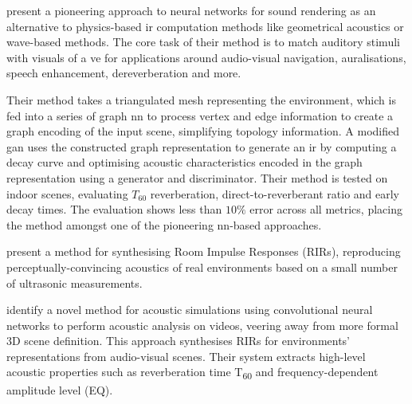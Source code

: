 \cite{ratnarajah2022mesh2ir} present a pioneering approach to neural networks for sound rendering as an alternative to physics-based \acrshort{ir} computation methods like geometrical acoustics or wave-based methods. The core task of their method is to match auditory stimuli with visuals of a \acrshort{ve} for applications around audio-visual navigation, auralisations, speech enhancement, dereverberation and more.\par
Their method takes a triangulated mesh representing the environment, which is fed into a series of graph \acrshort{nn} to process vertex and edge information to create a graph encoding of the input scene, simplifying topology information. A modified \acrfull{gan} uses the constructed graph representation to generate an \acrshort{ir} by computing a decay curve and optimising acoustic characteristics encoded in the graph representation using a generator and discriminator. Their method is tested on indoor scenes, evaluating $T_{60}$ reverberation, direct-to-reverberant ratio and early decay times. The evaluation shows less than $10\%$ error across all metrics, placing the method amongst one of the pioneering \acrshort{nn}-based approaches.\par

\cite{yang2020fast} present a method for synthesising Room Impulse Responses (RIRs), reproducing perceptually-convincing acoustics of real environments based on a small number of ultrasonic measurements.\par


\cite{li2018scene} identify a novel method for acoustic simulations using convolutional neural networks to perform acoustic analysis on videos, veering away from more formal 3D scene definition. This approach synthesises RIRs for environments' representations from audio-visual scenes. Their system extracts high-level acoustic properties such as reverberation time T\textsubscript{60} and frequency-dependent amplitude level (EQ).\par



